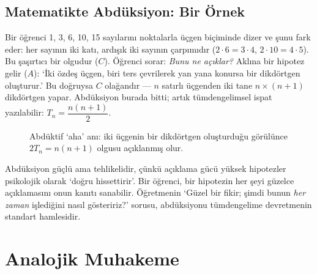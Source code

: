 \subsection{Matematikte Abdüksiyon: Bir Örnek}

\begin{ornek}
Bir öğrenci 1, 3, 6, 10, 15 sayılarını noktalarla üçgen biçiminde dizer ve şunu fark eder: her sayının iki katı, ardışık iki sayının çarpımıdır ($2\cdot 6=3\cdot4$, $2\cdot10=4\cdot5$). Bu şaşırtıcı bir olgudur ($C$). Öğrenci sorar: \emph{Bunu ne açıklar?} Aklına bir hipotez gelir ($A$): ‘İki özdeş üçgen, biri ters çevrilerek yan yana konursa bir dikdörtgen oluşturur.’ Bu doğruysa $C$ olağandır — $n$ satırlı üçgenden iki tane $n\times(n+1)$ dikdörtgen yapar. Abdüksiyon burada bitti; artık tümdengelimsel ispat yazılabilir: $T_n=\dfrac{n(n+1)}{2}$.
\end{ornek}

\begin{figure}[h]
\centering
{}
\caption{Abdüktif ‘aha’ anı: iki üçgenin bir dikdörtgen oluşturduğu görülünce $2T_n=n(n+1)$ olgusu açıklanmış olur.}
\end{figure}



\begin{yanilgi}
Abdüksiyon güçlü ama tehlikelidir, çünkü açıklama gücü yüksek hipotezler psikolojik olarak ‘doğru hissettirir’. Bir öğrenci, bir hipotezin her şeyi güzelce açıklamasını onun kanıtı sanabilir. Öğretmenin ‘Güzel bir fikir; şimdi bunun \emph{her zaman} işlediğini nasıl gösteririz?’ sorusu, abdüksiyonu tümdengelime devretmenin standart hamlesidir.
\end{yanilgi}

\section{Analojik Muhakeme}

